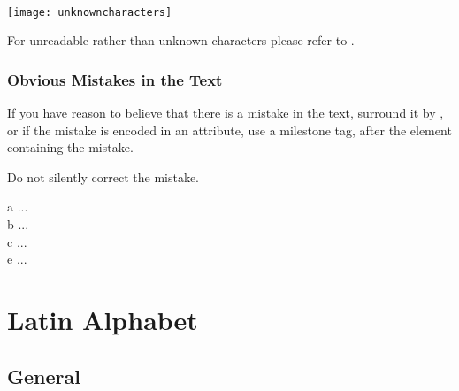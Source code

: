 \parbox{\linewidth}{{} \\[3mm] \texttt{[image: unknowncharacters]}}


\begin{crossref}
For unreadable rather than unknown characters please refer to .
\end{crossref}

\subsubsection{Obvious Mistakes in the Text}
\label{section obvious mistakes}

\begin{mainrule}
If you have reason to believe that there is a mistake in the text, surround it by , or if the mistake is encoded in an attribute, use a milestone tag,  after the element containing the mistake.
\end{mainrule}

\begin{clarification}
Do not silently correct the mistake.
\end{clarification}

\vspace{3mm}
\begin{example}

\vspace{-5mm}
\begin{typeLatin}
 a ...  \\
 b ...  \\
 c ...  \\
 e ... 
\end{typeLatin}
\end{example}


\section{Latin Alphabet}

\tocspace
\subsection{General}
\label{section latin general}

